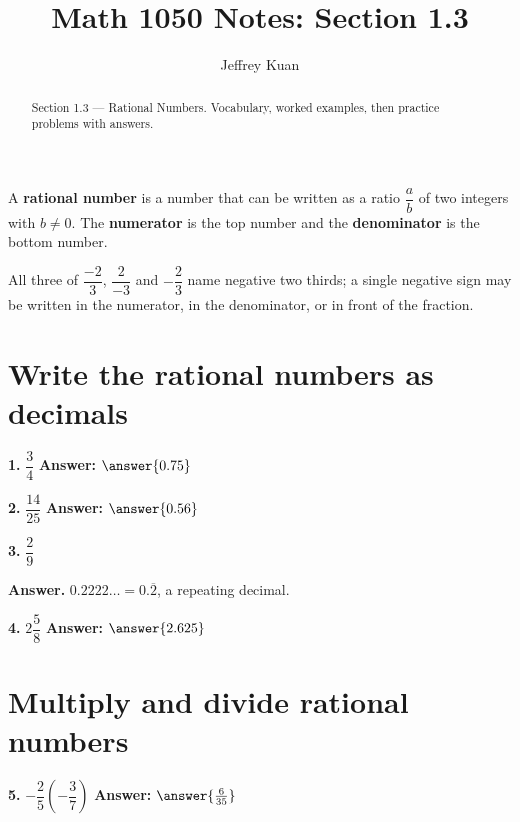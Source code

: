 \documentclass{ximera}
\author{Jeffrey Kuan}
\title{Math 1050 Notes: Section 1.3}
\begin{document}
\begin{abstract}
    Section 1.3 --- Rational Numbers.
    Vocabulary, worked examples, then practice problems with answers.
\end{abstract}

\maketitle

A \textbf{rational number} is a number that can be written as a ratio
$\dfrac{a}{b}$ of two integers with $b \neq 0$. The \textbf{numerator} is the top number
and the \textbf{denominator} is the bottom number.

All three of $\dfrac{-2}{3}$, $\dfrac{2}{-3}$ and $-\dfrac{2}{3}$ name negative two
thirds; a single negative sign may be written in the numerator, in the denominator, or in
front of the fraction.

\section*{Write the rational numbers as decimals}

\begin{problem}
\textbf{1.} $\dfrac{3}{4}$ \qquad \textbf{Answer:} $\answer{0.75}$
\end{problem}

\begin{problem}
\textbf{2.} $\dfrac{14}{25}$ \qquad \textbf{Answer:} $\answer{0.56}$
\end{problem}

\begin{problem}
\textbf{3.} $\dfrac{2}{9}$

\begin{hint}
\textbf{Answer.} $0.2222\ldots = 0.\overline{2}$, a repeating decimal.
\end{hint}
\end{problem}

\begin{problem}
\textbf{4.} $2\dfrac{5}{8}$ \qquad \textbf{Answer:} $\answer{2.625}$
\end{problem}

\section*{Multiply and divide rational numbers}

\begin{problem}
\textbf{5.} $-\dfrac{2}{5}\left(-\dfrac{3}{7}\right)$ \qquad
\textbf{Answer:} $\answer{\frac{6}{35}}$
\end{problem}
\end{document}
